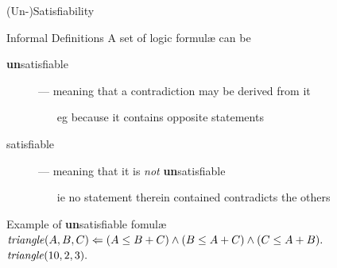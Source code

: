 \documentclass[presentation]{beamer}\mode<presentation>{\usetheme{AMSBolognaFC}}
\begin{document}
\begin{frame}{(Un-)Satisfiability}
    \begin{block}{Informal Definitions}
        A \alert{set} of logic formul\ae{} can be
        \begin{description}
            \item[\textbf{un}satisfiable] --- meaning that a \alert{contradiction} may be derived from it
            \begin{itemize}
                \item[eg] because it contains opposite statements
            \end{itemize} 

            \item[satisfiable] --- meaning that it is \emph{not} \textbf{un}satisfiable
            \begin{itemize}
                \item[ie] no statement therein contained contradicts the others
            \end{itemize}  
        \end{description}
    \end{block}

    \begin{exampleblock}{Example of \textbf{un}satisfiable fomul\ae{}}
        \centering
        $\text{\textit{triangle}}(A, B, C) \Leftarrow (A \leq B + C) \wedge (B \leq A + C) \wedge (C \leq A + B)  \mathtt{.}$
        \\
        $\text{\textit{triangle}}(10, 2, 3) \mathtt{.}$
    \end{exampleblock}

\end{frame}
\end{document}
